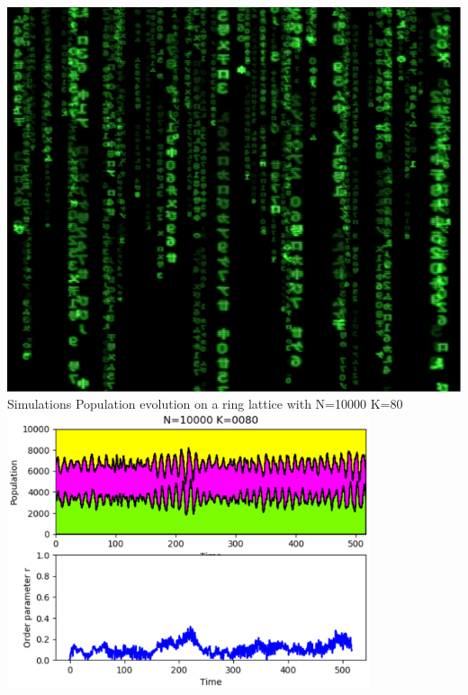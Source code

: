 \documentclass[serif,mathserif]{beamer}
\begin{document}
\begin{frame}{\includegraphics[height=0.06\textheight]{matrix.eps}\hspace{0.25cm} Simulations}
    \centering
    Population evolution on a ring lattice with N=10000 K=80\\
    \vspace{0.4cm}
    \includegraphics[width=0.8\textwidth]{pop-evolution-stacked-K_80.eps}
\end{frame}
\end{document}
